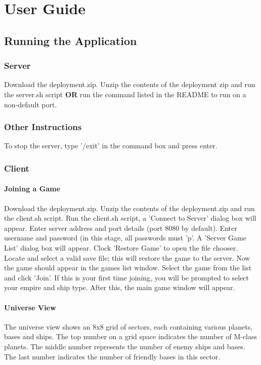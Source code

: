\chapter{User Guide}

\section{Running the Application}

\subsection{Server}
Download the deployment.zip.
Unzip the contents of the deployment zip and run the server.sh script \textbf{OR}  run the command listed in the README to run on a non-default port.

\subsection{Other Instructions}
To stop the server, type '/exit' in the command box and press enter.

\subsection{Client}

\subsubsection{Joining a Game}
Download the deployment.zip.
Unzip the contents of the deployment.zip and run the client.sh script.
Run the client.sh script, a 'Connect to Server' dialog box will appear.
Enter server address and port details (port 8080 by default).
Enter username and password (in this stage, all passwords must 'p'.
A 'Server Game List' dialog box will appear.
Clock 'Restore Game' to open the file chooser.
Locate and select a valid save file; this will restore the game to the server.
Now the game should appear in the games list window.
Select the game from the list and click 'Join'.
If this is your first time joining, you will be prompted to select your empire and ship type.
After this, the main game window will appear.

\subsubsection{Universe View}
The universe view shows an 8x8 grid of sectors, each containing various planets, bases and ships.
The top number on a grid space indicates the number of M-class planets.
The middle number represents the number of enemy ships and bases.
The last number indicates the number of friendly bases in this sector.

